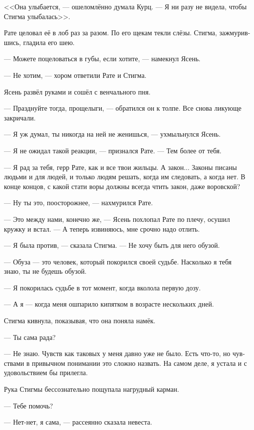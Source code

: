 \documentclass[a4paper,12pt,fleqn]{book}\usepackage{polyglossia}\setdefaultlanguage[babelshorthands=true]{russian}\setotherlanguage{english}\defaultfontfeatures{Ligatures=TeX,Mapping=tex-text}\usepackage{xcolor}\newcommand{\ml}[3]{#2}
\newcommand{\asterism}{\vspace{1em}{\centering\Large\bfseries$\ast~\ast~\ast$\par}\vspace{1em}}
\begin{document}
<<Она улыбается, --- ошеломлённо думала Курц.
--- Я ни разу не видела, чтобы Стигма улыбалась>>.

Рате целовал её в лоб раз за разом.
По его щекам текли слёзы.
Стигма, зажмурившись, гладила его шею.

--- Можете поцеловаться в губы, если хотите, --- намекнул Ясень.

--- Не хотим, --- хором ответили Рате и Стигма.

Ясень развёл руками и сошёл с венчального пня.

--- Празднуйте тогда, прощелыги, --- обратился он к толпе.
Все снова ликующе закричали.

\asterism

--- Я уж думал, ты никогда на ней не женишься, --- ухмыльнулся Ясень.

--- Я не ожидал такой реакции, --- признался Рате.
--- Тем более от тебя.

--- Я рад за тебя, герр Рате, как и все твои жильцы.
А закон...
Законы писаны людьми и для людей, и только людям решать, когда им следовать, а когда нет.
В конце концов, с какой стати воры должны всегда чтить закон, даже воровской?

--- Ну ты это, поосторожнее, --- нахмурился Рате.

--- Это между нами, конечно же, --- Ясень похлопал Рате по плечу, осушил кружку и встал.
--- А теперь извиняюсь, мне срочно надо отлить.

\asterism

--- Я была против, --- сказала Стигма.
--- Не хочу быть для него обузой.

--- Обуза --- это человек, который покорился своей судьбе.
Насколько я тебя знаю, ты не будешь обузой.

--- Я покорилась судьбе в тот момент, когда вколола первую дозу.

--- А я --- когда меня ошпарило кипятком в возрасте нескольких дней.

Стигма кивнула, показывая, что она поняла намёк.

--- Ты сама рада?

--- Не знаю.
Чувств как таковых у меня давно уже не было.
Есть что-то, но чувствами в привычном понимании это сложно назвать.
На самом деле, я устала и с удовольствием бы прилегла.

Рука Стигмы бессознательно пощупала нагрудный карман.

--- Тебе помочь?

--- Нет-нет, я сама, --- рассеянно сказала невеста.
\end{document}
